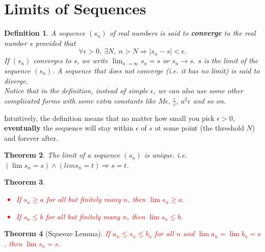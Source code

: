 \documentclass[12pt, lettersize]{book}
\newtheorem{thm}{Theorem}[section]
\newtheorem{dfn}[thm]{Definition}
\begin{document}
	\section{Limits of Sequences}		
		\begin{dfn}\label{def:limit}
		A sequence $(s_n)$ of real numbers is said to \textbf{converge} to the real number \emph{$s$} provided that
		\begin{displaymath}
			\forall \epsilon > 0,\ \exists N,\ n > N \Rightarrow |s_n-s| < \epsilon.
		\end{displaymath}
		If $(s_n)$ converges to $s$, we write $\lim_{n\rightarrow \infty}s_n=s$ or $s_n\rightarrow s$. $s$ is the \emph{limit} of the sequence $(s_n)$.
		A sequence that does not converge (i.e. it has no \emph{limit}) is said to \emph{diverge}.\\
		Notice that in the definition, instead of simple $\epsilon$, we can also use some other complicated forms with some extra constants like $M\epsilon,\ \frac{\epsilon}{c},\ a^2\epsilon$ and so on.
		\end{dfn}
	
		Intuitively, the definition means that no matter how small you pick $\epsilon>0$, \textbf{eventually} the sequence will stay within $\epsilon$ of $s$ at some point (the threshold $N$) and forever after.
	
		\begin{thm}
		The limit of a sequence $(s_n)$ is unique. i.e. $(\lim s_n=s) \land (lim s_n=t) \Rightarrow s=t$.
		\end{thm}
		
		\begin{thm}
		\textcolor{red}{
		\begin{itemize}
			\item If $s_n\geq a$ for all but finitely many $n$, then $\lim s_n\geq a$.
			\item If $s_n\leq b$ for all but finitely many $n$, then $\lim s_n\leq b$.
		\end{itemize}}
		\end{thm}
		
		\begin{thm}[Squeeze Lemma]\label{lem: squeeze}
			\textcolor{red}{If $a_n\leq s_n\leq b_n$ for all $n$ and $\lim a_n=\lim b_n=s$, then $\lim s_n=s$.}
		\end{thm}
		
		\newpage
	
\end{document}
